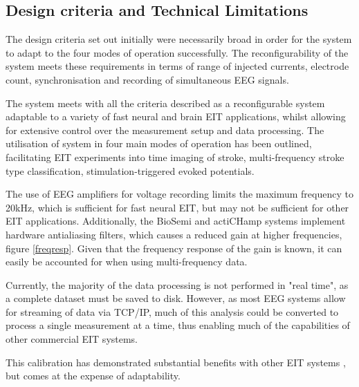 \subsection{Design criteria and Technical Limitations}
The design criteria set out initially were necessarily broad in order for the system to adapt to the four modes of operation successfully. The reconfigurability of the system meets these requirements in terms of range of injected currents, electrode count, synchronisation and recording of simultaneous EEG signals. 

The system meets with all the criteria described as a reconfigurable system adaptable to a variety of fast neural and brain EIT applications, whilst allowing for extensive control over the measurement setup and data processing. The utilisation of system in four main modes of operation has been outlined, facilitating EIT experiments into time imaging of stroke, multi-frequency stroke type classification, stimulation-triggered evoked potentials. 

The use of EEG amplifiers for voltage recording limits the maximum frequency to 20kHz, which is sufficient for fast neural EIT, but may not be sufficient for other EIT applications. Additionally, the BioSemi and actiCHamp systems implement hardware antialiasing filters, which causes a reduced gain at higher frequencies, figure \ref{freqresp}. Given that the frequency response of the gain is known, it can easily be accounted for when using multi-frequency data.

Currently, the majority of the data processing is not performed in "real time", as a complete dataset must be saved to disk. However, as most EEG systems allow for streaming of data via TCP/IP, much of this analysis could be converted to process a single measurement at a time, thus enabling much of the capabilities of other commercial EIT systems.

This calibration has demonstrated substantial benefits with other EIT systems \cite{Hun_Wi_2014} \cite{khan}, but comes at the expense of adaptability.